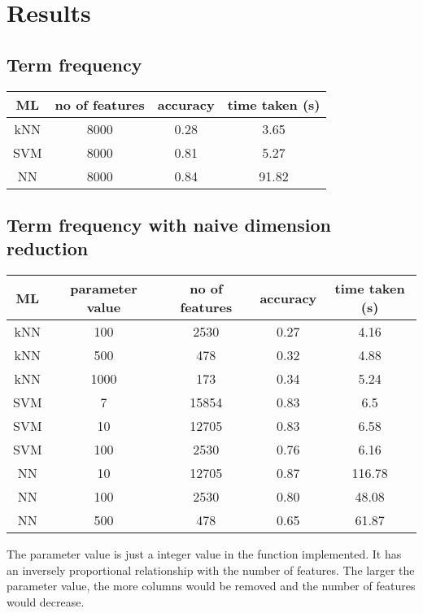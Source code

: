 \chapter{Results}
\section{Term frequency}

\begin{center}
	\begin{tabular}{|| c | c | c | c||}
		\hline
		ML & no of features & accuracy & time taken (s) \\ [0.5ex]
		\hline\hline
		kNN & 8000 & 0.28 & 3.65 \\ 
		\hline
		SVM & 8000 & 0.81 & 5.27 \\
		\hline
		NN & 8000 & 0.84 & 91.82 \\
		\hline
	\end{tabular}
\end{center}

\section{Term frequency with naive dimension reduction}

\begin{center}
	\begin{tabular}{|| c | c | c | c | c||}
		\hline
		ML & parameter value & no of features & accuracy & time taken (s) \\ [0.5ex]
		\hline\hline
		kNN & 100 & 2530 & 0.27 & 4.16 \\ 
		\hline
		kNN & 500 & 478 & 0.32 & 4.88 \\ 
		\hline
		kNN & 1000 & 173 & 0.34 & 5.24 \\ 
		\hline\hline
		SVM & 7 & 15854 & 0.83 & 6.5 \\
		\hline
		SVM & 10 & 12705 & 0.83 & 6.58 \\
		\hline
		SVM & 100 & 2530 & 0.76 & 6.16 \\
		\hline\hline
		NN & 10 & 12705 & 0.87 & 116.78 \\
		\hline
		NN & 100 & 2530 & 0.80 & 48.08 \\
		\hline
		NN & 500 & 478 & 0.65 & 61.87 \\
		\hline\hline
	\end{tabular}
\end{center}

The parameter value is just a integer value in the function implemented. It has an inversely proportional relationship with the number of features. The larger the parameter value, the more columns would be removed and the number of features would decrease.


